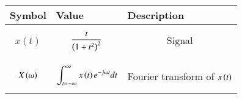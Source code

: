 \begin{tabular}{|p{2cm}|p{2.80cm}|p{2.70cm}|}
    \hline
    Symbol&Value&Description\\ \hline
    $$x(t)$$&$$\frac{t}{\left(1+t^2\right)^2}$$&$$\text{Signal}$$\\\hline
    $$X\left(\omega\right)$$&$$\int_{t=-\infty}^{\infty}x\left(t\right)e^{-j\omega t}dt$$& Fourier transform of $x\left(t\right)$\\\hline
    \end{tabular}